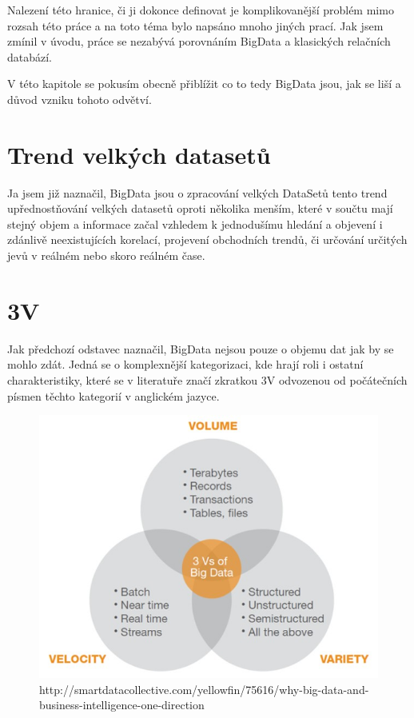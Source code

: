 \documentclass[thesis=M,czech]{FITthesis}[2012/06/26]
\begin{document}
Nalezení této hranice, či ji dokonce definovat je komplikovanější problém mimo rozsah této práce a na toto téma bylo napsáno mnoho jiných prací. Jak jsem zmínil v úvodu, práce se nezabývá porovnáním BigData a klasických relačních databází. 

V této kapitole se pokusím obecně přiblížit co to tedy BigData jsou, jak se liší a důvod vzniku tohoto odvětví.


\section{Trend velkých datasetů}
Ja jsem již naznačil, BigData jsou o zpracování velkých DataSetů tento trend upřednostňování velkých datasetů oproti několika menším, které v součtu mají stejný objem a informace začal vzhledem k jednodušímu hledání a objevení i zdánlivě neexistujících korelací, projevení obchodních trendů, či určování určitých jevů v reálném nebo skoro reálném čase. 

\section{3V}
Jak předchozí odstavec naznačil, BigData nejsou pouze o objemu dat jak by se mohlo zdát. Jedná se o komplexnější kategorizaci, kde hrají roli i ostatní charakteristiky, které se v literatuře značí zkratkou 3V odvozenou od počátečních písmen těchto kategorií v anglickém jazyce. 

\begin{figure}[h]
\centering
\includegraphics[scale=0.6]{images/3v}
\caption{http://smartdatacollective.com/yellowfin/75616/why-big-data-and-business-intelligence-one-direction}
\label{fig:3v}

\end{figure}
\end{document}
